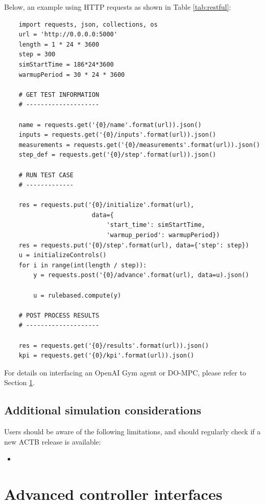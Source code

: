 \documentclass{article}
\begin{document}
Below, an example using HTTP requests as shown in Table \ref{tab:restful}:

\begin{verbatim}
    import requests, json, collections, os
    url = 'http://0.0.0.0:5000'
    length = 1 * 24 * 3600
    step = 300
    simStartTime = 186*24*3600
    warmupPeriod = 30 * 24 * 3600

    # GET TEST INFORMATION
    # --------------------

    name = requests.get('{0}/name'.format(url)).json()
    inputs = requests.get('{0}/inputs'.format(url)).json()
    measurements = requests.get('{0}/measurements'.format(url)).json()
    step_def = requests.get('{0}/step'.format(url)).json()

    # RUN TEST CASE
    # -------------

    res = requests.put('{0}/initialize'.format(url), 
                        data={
                            'start_time': simStartTime, 
                            'warmup_period': warmupPeriod})
    res = requests.put('{0}/step'.format(url), data={'step': step})
    u = initializeControls()  
    for i in range(int(length / step)):
        y = requests.post('{0}/advance'.format(url), data=u).json()

        u = rulebased.compute(y)

    # POST PROCESS RESULTS
    # --------------------

    res = requests.get('{0}/results'.format(url)).json()
    kpi = requests.get('{0}/kpi'.format(url)).json()
\end{verbatim}

For details on interfacing an OpenAI Gym agent or DO-MPC, please refer to Section \ref{s:advctrl}.

\subsection{Additional simulation considerations}

Users should be aware of the following limitations, and should regularly check if a new ACTB release is available:

\begin{itemize}
    \item 
\end{itemize}

\section{Advanced controller interfaces}\label{s:advctrl}
\end{document}
